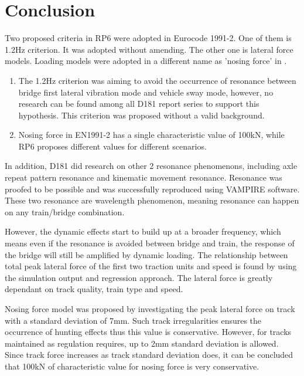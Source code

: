 

\chapter{Conclusion}


Two proposed criteria in RP6\citet{d181} were adopted in Eurocode 1991-2. One of them is 1.2Hz criterion. It was adopted without amending. The other one is lateral force models. Loading models were adopted in a different name as 'nosing force' in \citet[A6.5.2]{EC12}. 

\begin{enumerate}[-]
\item The 1.2Hz criterion was aiming to avoid the occurrence of resonance between bridge first lateral vibration mode and vehicle sway mode, however, no research can be found among all D181 report series to support this hypothesis. This criterion was proposed without a valid background.

\item Nosing force in EN1991-2 has a single characteristic value of 100kN, while RP6 proposes different values for different scenarios.
\end{enumerate}

In addition, D181 did research on other 2 resonance phenomenons, including axle repeat pattern resonance and kinematic movement resonance. Resonance was proofed to be possible and was successfully reproduced using VAMPIRE software. These two resonance are wavelength phenomenon, meaning resonance can happen on any train/bridge combination.

However, the dynamic effects start to build up at a broader frequency, which means even if the resonance is avoided between bridge and train, the response of the bridge will still be amplified by dynamic loading. The relationship between total peak lateral force of the first two traction units and speed is found by using the simulation output and regression approach. The lateral force is greatly dependant on track quality, train type and speed.

Nosing force model was proposed by investigating the peak lateral force on track with a standard deviation of 7mm. Such track irregularities ensures the occurrence of hunting effects thus this value is conservative. However, for tracks maintained as regulation requires, up to 2mm standard deviation is allowed. Since track force increases as track standard deviation does, it can be concluded that 100kN of characteristic value for nosing force is very conservative.

